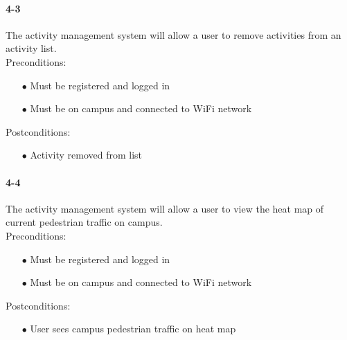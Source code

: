 \documentclass[a4paper,12pt]{article}
\begin{document}
\paragraph{4-3}
The activity management system will allow a user to remove activities from an activity list.\\
Preconditions:
\begin{itemize}
	\item[$\bullet$] Must be registered and logged in
	\item[$\bullet$] Must be on campus and connected to WiFi network
\end{itemize}
Postconditions:
\begin{itemize}
	\item[$\bullet$] Activity removed from list
\end{itemize}
\paragraph{4-4}
The activity management system will allow a user to view the heat map of current pedestrian traffic on campus.\\
Preconditions:
\begin{itemize}
	\item[$\bullet$] Must be registered and logged in
	\item[$\bullet$] Must be on campus and connected to WiFi network
\end{itemize}
Postconditions:
\begin{itemize}
	\item[$\bullet$] User sees campus pedestrian traffic on heat map
\end{itemize}
\end{document}
